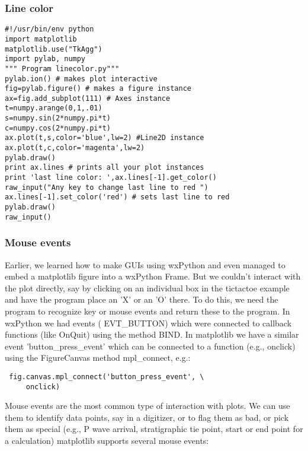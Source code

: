 \subsubsection{Line color}
{\singlespacing \color{blue} \begin{verbatim}
#!/usr/bin/env python
import matplotlib
matplotlib.use("TkAgg")
import pylab, numpy
""" Program linecolor.py"""
pylab.ion() # makes plot interactive
fig=pylab.figure() # makes a figure instance
ax=fig.add_subplot(111) # Axes instance
t=numpy.arange(0,1,.01)
s=numpy.sin(2*numpy.pi*t)
c=numpy.cos(2*numpy.pi*t)
ax.plot(t,s,color='blue',lw=2) #Line2D instance
ax.plot(t,c,color='magenta',lw=2)
pylab.draw()
print ax.lines # prints all your plot instances
print 'last line color: ',ax.lines[-1].get_color()
raw_input("Any key to change last line to red ")
ax.lines[-1].set_color('red') # sets last line to red
pylab.draw()
raw_input()
\end{verbatim}}



\subsubsection{Mouse events}

Earlier, we learned how to make GUIs using {\color{blue}wxPython} and even managed to embed a {\color{blue}matplotlib} figure into a {\color{blue}wxPython Frame}.  But we couldn't interact with the plot directly, say by clicking on an individual box in the tictactoe example and have the program place an 'X' or an 'O' there.  
To do this, we need the program to recognize key or mouse events and return these to the program.
 In {\color{blue}wxPython} we had events ({\color{blue} EVT\_BUTTON}) which were connected to callback functions (like {\color{blue} OnQuit}) using the method {\color{blue}BIND}.  
In {\color{blue}matplotlib}  we have a similar event  {\color{blue}'button\_press\_event' } which can be connected to a function (e.g., {\color{blue}onclick}) using the {\color{blue}FigureCanvas} method {\color{blue} mpl\_connect}, e.g.:

{%
{\singlespacing \color{blue} \begin{verbatim}
 fig.canvas.mpl_connect('button_press_event', \
     onclick)
 \end{verbatim}}
 }
 
 
 Mouse events are the most common type of interaction with plots.
We can use them to identify data points, say in a digitizer, or to flag them as bad, or pick them as special (e.g., P wave arrival, stratigraphic tie point, start or end point for a calculation)
matplotlib supports several mouse events:


